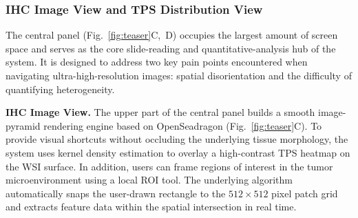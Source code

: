 \documentclass[journal]{vgtc}                     %
\begin{document}
\subsubsection{IHC Image View and TPS Distribution View}

The central panel (Fig.~\ref{fig:teaser}C,~D) occupies the largest amount of screen space and serves as the core slide-reading and quantitative-analysis hub of the system. It is designed to address two key pain points encountered when navigating ultra-high-resolution images: spatial disorientation and the difficulty of quantifying heterogeneity.

\textbf{IHC Image View.} The upper part of the central panel builds a smooth image-pyramid rendering engine based on OpenSeadragon (Fig.~\ref{fig:teaser}C). To provide visual shortcuts without occluding the underlying tissue morphology, the system uses kernel density estimation to overlay a high-contrast TPS heatmap on the WSI surface. In addition, users can frame regions of interest in the tumor microenvironment using a local ROI tool. The underlying algorithm automatically snaps the user-drawn rectangle to the $512 \times 512$ pixel patch grid and extracts feature data within the spatial intersection in real time.
\end{document}
